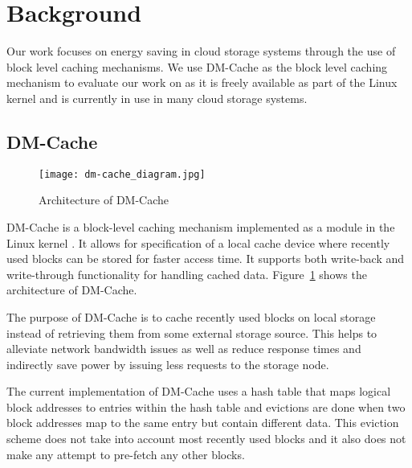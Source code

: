 \section{Background}

Our work focuses on energy saving in cloud storage systems through the use of
block level caching mechanisms. We use DM-Cache as the block level caching
mechanism to evaluate our work on as it is freely available as part of the Linux
kernel and is currently in use in many cloud storage systems.

\subsection{DM-Cache}

\begin{figure}[htb]
  \caption{Architecture of DM-Cache}
  \centering \texttt{[image: dm-cache\_diagram.jpg]}
  \label{fig:dm-cache}
\end{figure}

DM-Cache is a block-level caching mechanism implemented as a module in the Linux
kernel \cite{DM-Cache}. It allows for specification of a local cache device
where recently used blocks can be stored for faster access time. It supports
both write-back and write-through functionality for handling cached
data. Figure~\ref{fig:dm-cache} shows the architecture of DM-Cache.

The purpose of DM-Cache is to cache recently used blocks on local storage
instead of retrieving them from some external storage source. This helps to
alleviate network bandwidth issues as well as reduce response times and
indirectly save power by issuing less requests to the storage node.

The current implementation of DM-Cache uses a hash table that maps logical block
addresses to entries within the hash table and evictions are done when two block
addresses map to the same entry but contain different data. This eviction scheme
does not take into account most recently used blocks and it also does not make
any attempt to pre-fetch any other blocks.
